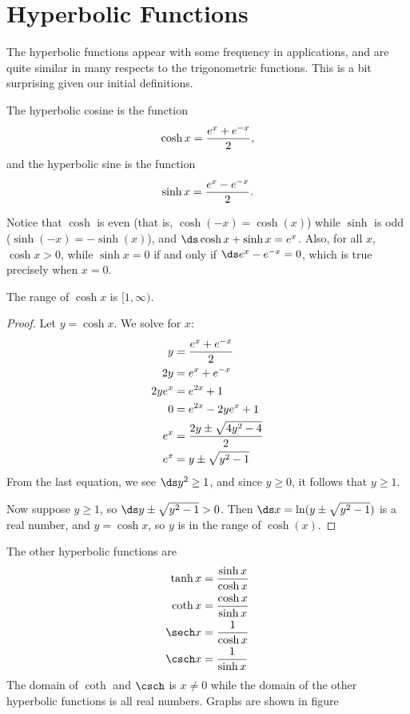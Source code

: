 \section{Hyperbolic Functions}{}{}
\label{sec:hyperbolic functions}
\nobreak
The hyperbolic functions appear with some frequency in applications,
and are quite similar in many respects to the trigonometric
functions. This is a bit surprising given our initial definitions.

\begin{definition}
The {\dfont hyperbolic cosine} is the function
$$\cosh x ={e^x +e^{-x }\over2},$$
and the {\dfont hyperbolic sine} is the function
$$\sinh x ={e^x -e^{-x}\over 2}.$$
\end{definition}

Notice that $\cosh$ is even (that is, $\cosh(-x)=\cosh(x)$)
while $\sinh$ is odd ($\sinh(-x)=-\sinh(x)$), and
$\ds\cosh x + \sinh x = e^x$. Also, for all $x$,
$\cosh x >0$, while $\sinh x=0$ if and only if $\ds e^x -e^{-x }=0$,
which is true precisely when $x=0$.

\begin{lemma} 
The range of $\cosh x$ is $[1,\infty)$.
\end{lemma}
\begin{proof}
Let $y= \cosh x$. We solve for $x$:
\begin{align*}
y&={e^x +e^{-x }\over 2} \\
2y &= e^x + e^{-x } \\
2ye^x &= e^{2x} + 1 \\
 0 &= e^{2x}-2ye^x +1 \\
 e^{x} &= {2y \pm \sqrt{4y^2 -4}\over 2} \\
 e^{x} &= y\pm \sqrt{y^2 -1} \\
\end{align*}
From the last equation, we see $\ds y^2 \geq 1$, and since
$y\geq 0$, it follows that $y\geq 1$.

Now suppose $y\geq 1$, so $\ds y\pm \sqrt{y^2 -1}>0$. Then
$\ds x = \ln(y\pm \sqrt{y^2 -1})$ is a real number, and 
$y =\cosh x$, so $y$ is in the range of $\cosh(x)$.
\end{proof}

\begin{definition} The other hyperbolic functions are
\begin{align*}
\tanh x &= {\sinh x\over\cosh x} \\
\coth x &= {\cosh x\over\sinh x} \\
\sech x &= {1\over\cosh x} \\
\csch x &= {1\over\sinh x} \\
\end{align*}
The domain  of $\coth$ and $\csch$  is $x\neq 0$ while the domain of
the other hyperbolic functions is all real numbers. Graphs are shown
in figure~
\end{definition}

